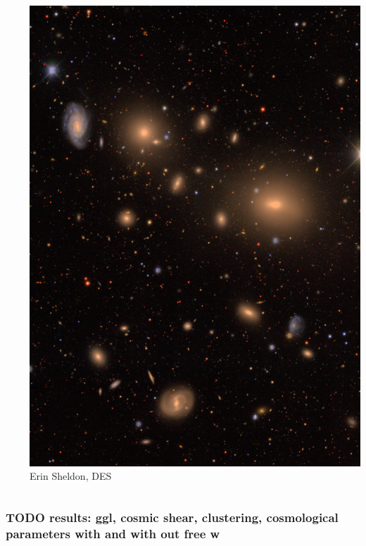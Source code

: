 \documentclass{beamer}
\begin{document}
{\begin{columns}
\begin{column}{0.5\textwidth}
\begin{enumerate}
            \end{enumerate}
        \end{column}
        \begin{column}{0.5\textwidth}
            \begin{center}
                \includegraphics[width=\textwidth]{DES0012-5705-gri-group.jpg}
                \newline
                {\tiny Erin Sheldon, DES}
            \end{center}
        \end{column}
    \end{columns}
}


\frame
{
    \frametitle{TODO results: ggl, cosmic shear, clustering, cosmological parameters with and with out free w}


}
\end{document}
